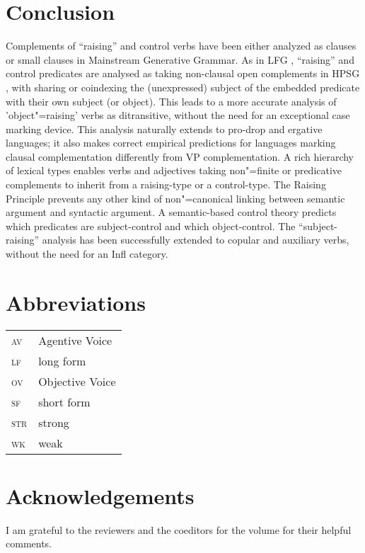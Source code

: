 \documentclass[output=paper
	        ,collection
	        ,collectionchapter
 	        ,biblatex
                ,babelshorthands
                ,newtxmath
                ,draftmode
                ,colorlinks, citecolor=brown
]{langscibook}
\begin{document}
	
\section{Conclusion}
Complements of ``raising'' and control verbs have been either analyzed as clauses \citep{Chomsky81a} or small clauses \citep{Stowell81a-u,Stowell1983} in Mainstream Generative Grammar.
As in LFG \citep{Bresnan1982}, ``raising'' and control predicates are analysed as taking non-clausal open complements in HPSG \citep{PollardandSag1994}, with sharing or coindexing the (unexpressed) subject of the embedded predicate with their own subject (or object). This leads to a more accurate analysis of 'object"=raising' verbs as ditransitive, without the need for an exceptional case marking device. This analysis naturally extends to pro-drop and ergative languages; it also makes correct empirical predictions for languages marking clausal complementation differently from VP complementation. A rich hierarchy of lexical types enables verbs and adjectives taking non"=finite or predicative complements to inherit from a raising-type or a control-type. The Raising Principle prevents any other kind of non"=canonical linking between semantic argument and syntactic argument. A semantic-based control theory predicts which predicates are subject-control and which object-control. The ``subject-raising'' analysis has been successfully extended to copular and auxiliary verbs, without the need for an Infl category.




\section*{Abbreviations}

\begin{tabularx}{.45\textwidth}{lX}
\textsc{av} & Agentive Voice\\
\textsc{lf} & long form\\ 
\textsc{ov} & Objective Voice\\
\textsc{sf} & short form\\
\textsc{str} & strong\\
\textsc{wk} & weak\\

\end{tabularx}

\section*{Acknowledgements}

I am grateful to the reviewers and the coeditors for the volume for their helpful comments.
{\sloppy
\printbibliography[heading=subbibliography,notkeyword=this] 
}
\end{document}
